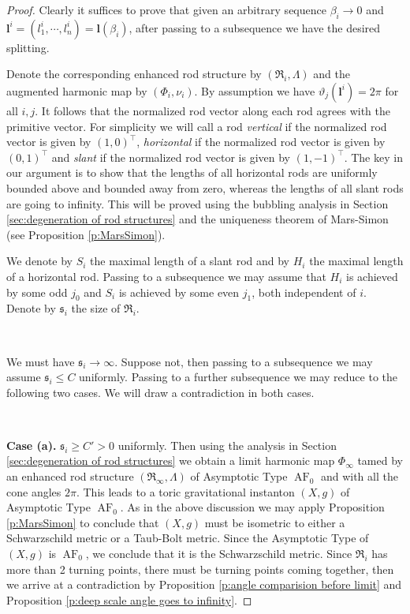 \documentclass[a4paper,11pt]{amsart}
\theoremstyle{definition}
\numberwithin{equation}{section}
\newcommand{\bl}{\bm{l}}
\newcommand{\ms} {\mathfrak s}
\newcommand{\mR} {\mathfrak R}
\DeclareMathOperator{\AF}{AF}
\begin{document}
\begin{proof} 
    Clearly it suffices to prove that given an arbitrary sequence $\beta_i\rightarrow 0$ and $\bl^i=(l^{i}_1, \cdots, l^i_n)=\bl(\beta_i)$, after passing to a subsequence we have the desired splitting. 
 
 
    Denote the corresponding enhanced rod structure by $(\mR_i, \Lambda)$  and the augmented harmonic map by $(\Phi_i, \nu_i)$.  By assumption we have  $\vartheta_{j}(\bl^i)=2\pi$ for all $i, j$. It follows that the normalized rod vector along each rod agrees with the primitive vector. 
    For simplicity we will call a rod \emph{vertical} if the normalized rod vector is given by $(1,0)^\top$,  \emph{horizontal} if the normalized rod vector is given by $(0, 1)^\top$ and  \emph{slant} if the normalized rod vector is given by $(1,-1)^\top$.  The key in our argument is to show that  the lengths of all horizontal rods are uniformly bounded above and bounded away from zero, whereas the lengths of all slant rods are going to infinity. This will be proved using the bubbling analysis in Section \ref{sec:degeneration of rod structures} and the uniqueness theorem of Mars-Simon (see Proposition \ref{p:MarsSimon}). 


We denote by $S_i$ the maximal length of a slant rod and by $H_i$ the maximal length of a horizontal rod.  Passing to a subsequence we may assume that $H_i$ is achieved by some odd $j_0$ and $S_i$ is achieved by some even $j_1$, both independent of $i$. Denote by $\ms_i$  the size of $\mR_i$.
 
\

 We must have $\ms_i\rightarrow\infty$. Suppose not, then passing to a subsequence we may assume $\ms_i\leq C$ uniformly. Passing to a further subsequence we may reduce to the following two cases. We will draw a contradiction in both cases.

\

{\bf Case (a).} $\ms_i\geq C'>0$ uniformly. Then using the analysis in Section \ref{sec:degeneration of rod structures} we obtain a limit harmonic map $\Phi_\infty$ tamed by an enhanced rod structure $(\mR_\infty,\Lambda)$ of Asymptotic Type $\AF_0$ and with all the cone angles $2\pi$. This leads to a toric gravitational instanton $(X, g)$ of Asymptotic Type $\AF_0$. As in the above discussion we may apply Proposition \ref{p:MarsSimon} to conclude that $(X, g)$ must be isometric to either a Schwarzschild metric or a Taub-Bolt metric. Since the Asymptotic Type of $(X,g)$ is $\AF_0$, we conclude that it is the Schwarzschild metric. Since $\mR_i$ has more than 2 turning points, there must be turning points coming together, then we arrive at a contradiction by Proposition \ref{p:angle comparision before limit} and Proposition \ref{p:deep scale angle goes to infinity}.



\end{proof}
\end{document}
